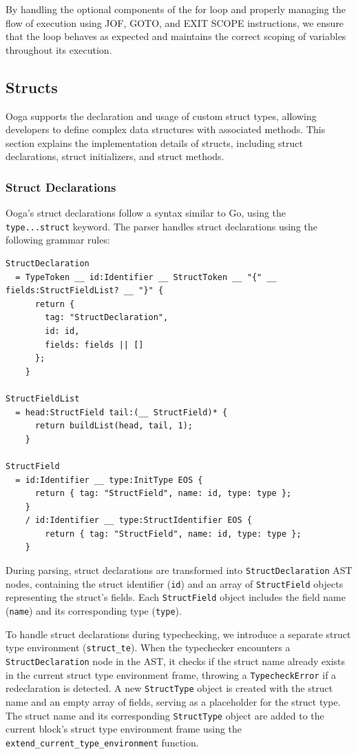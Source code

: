 \documentclass{report}
\begin{document}
By handling the optional components of the for loop and properly managing the flow of execution using JOF, GOTO, and EXIT SCOPE instructions, we ensure that the loop behaves as expected and maintains the correct scoping of variables throughout its execution.

\subsection{Structs}

Ooga supports the declaration and usage of custom struct types, allowing developers to define complex data structures with associated methods. This section explains the implementation details of structs, including struct declarations, struct initializers, and struct methods.

\subsubsection{Struct Declarations}

Ooga's struct declarations follow a syntax similar to Go, using the \texttt{type...struct} keyword. The parser handles struct declarations using the following grammar rules:

\begin{verbatim}
StructDeclaration
  = TypeToken __ id:Identifier __ StructToken __ "{" __ fields:StructFieldList? __ "}" {
      return {
        tag: "StructDeclaration",
        id: id,
        fields: fields || []
      };
    }

StructFieldList
  = head:StructField tail:(__ StructField)* {
      return buildList(head, tail, 1);
    }

StructField
  = id:Identifier __ type:InitType EOS {
      return { tag: "StructField", name: id, type: type };
    }
    / id:Identifier __ type:StructIdentifier EOS {
        return { tag: "StructField", name: id, type: type };
    }
\end{verbatim}

During parsing, struct declarations are transformed into \texttt{StructDeclaration} AST nodes, containing the struct identifier (\texttt{id}) and an array of \texttt{StructField} objects representing the struct's fields. Each \texttt{StructField} object includes the field name (\texttt{name}) and its corresponding type (\texttt{type}).

To handle struct declarations during typechecking, we introduce a separate struct type environment (\texttt{struct\_te}). When the typechecker encounters a \texttt{StructDeclaration} node in the AST, it checks if the struct name already exists in the current struct type environment frame, throwing a \texttt{TypecheckError} if a redeclaration is detected. A new \texttt{StructType} object is created with the struct name and an empty array of fields, serving as a placeholder for the struct type. The struct name and its corresponding \texttt{StructType} object are added to the current block's struct type environment frame using the \texttt{extend\_current\_type\_environment} function.
\end{document}
